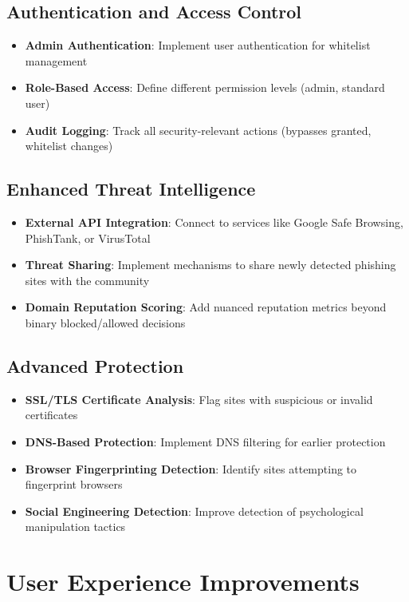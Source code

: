 \subsection{Authentication and Access Control}
\begin{itemize}
    \item \textbf{Admin Authentication}: Implement user authentication for whitelist management
    \item \textbf{Role-Based Access}: Define different permission levels (admin, standard user)
    \item \textbf{Audit Logging}: Track all security-relevant actions (bypasses granted, whitelist changes)
\end{itemize}

\subsection{Enhanced Threat Intelligence}
\begin{itemize}
    \item \textbf{External API Integration}: Connect to services like Google Safe Browsing, PhishTank, or VirusTotal
    \item \textbf{Threat Sharing}: Implement mechanisms to share newly detected phishing sites with the community
    \item \textbf{Domain Reputation Scoring}: Add nuanced reputation metrics beyond binary blocked/allowed decisions
\end{itemize}

\subsection{Advanced Protection}
\begin{itemize}
    \item \textbf{SSL/TLS Certificate Analysis}: Flag sites with suspicious or invalid certificates
    \item \textbf{DNS-Based Protection}: Implement DNS filtering for earlier protection
    \item \textbf{Browser Fingerprinting Detection}: Identify sites attempting to fingerprint browsers
    \item \textbf{Social Engineering Detection}: Improve detection of psychological manipulation tactics
\end{itemize}

\section{User Experience Improvements}

